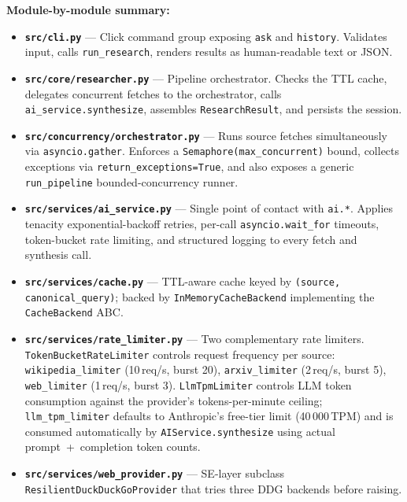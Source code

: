 \documentclass[11pt,a4paper]{article}
\begin{document}
\textbf{Module-by-module summary:}
\begin{itemize}[itemsep=3pt]
  \item \textbf{\texttt{src/cli.py}} --- Click command group exposing \texttt{ask} and
    \texttt{history}. Validates input, calls \texttt{run\_research}, renders results
    as human-readable text or JSON.

  \item \textbf{\texttt{src/core/researcher.py}} --- Pipeline orchestrator. Checks the
    TTL cache, delegates concurrent fetches to the orchestrator, calls
    \texttt{ai\_service.synthesize}, assembles \texttt{ResearchResult}, and persists
    the session.

  \item \textbf{\texttt{src/concurrency/orchestrator.py}} --- Runs source fetches
    simultaneously via \texttt{asyncio.gather}. Enforces a
    \texttt{Semaphore(max\_concurrent)} bound, collects exceptions via
    \texttt{return\_exceptions=True}, and also exposes a generic
    \texttt{run\_pipeline} bounded-concurrency runner.

  \item \textbf{\texttt{src/services/ai\_service.py}} --- Single point of contact with
    \texttt{ai.*}. Applies tenacity exponential-backoff retries, per-call
    \texttt{asyncio.wait\_for} timeouts, token-bucket rate limiting, and structured
    logging to every fetch and synthesis call.

  \item \textbf{\texttt{src/services/cache.py}} ---
    TTL-aware cache keyed by \texttt{(source, canonical\_query)};
    backed by \texttt{InMemoryCacheBackend} implementing the \texttt{CacheBackend} ABC.

  \item \textbf{\texttt{src/services/rate\_limiter.py}} --- Two complementary rate limiters.
    \texttt{TokenBucketRateLimiter} controls request frequency per source:
    \texttt{wikipedia\_limiter} (10\,req/s, burst 20),
    \texttt{arxiv\_limiter} (2\,req/s, burst 5),
    \texttt{web\_limiter} (1\,req/s, burst 3).
    \texttt{LlmTpmLimiter} controls LLM token consumption against the provider's
    tokens-per-minute ceiling; \texttt{llm\_tpm\_limiter} defaults to Anthropic's
    free-tier limit (40\,000\,TPM) and is consumed automatically by
    \texttt{AIService.synthesize} using actual prompt~+~completion token counts.

  \item \textbf{\texttt{src/services/web\_provider.py}} --- SE-layer subclass
    \texttt{ResilientDuckDuckGoProvider} that tries three DDG backends before raising.


\end{itemize}
\end{document}
